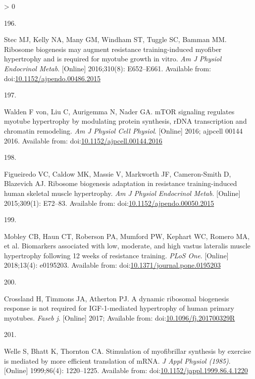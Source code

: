 \documentclass[twoside,10pt]{gihclass} %
\newlength{\cslhangindent}
\newlength{\csllabelwidth}
\newenvironment{CSLReferences}[3] %
 {%
  \setlength{\parindent}{0pt}
  \ifodd #1 \everypar{\setlength{\hangindent}{\cslhangindent}}\ignorespaces\fi
  \ifnum #2 > 0
  \setlength{\parskip}{#2\baselineskip}
  \fi
 }%
 {}
\newcommand{\CSLLeftMargin}[1]{\parbox[t]{\maxof{\widthof{#1}}{\csllabelwidth}}{#1}}
\newcommand{\CSLRightInline}[1]{\parbox[t]{\linewidth}{#1}}
\begin{document}
\begin{CSLReferences}{0}{0}
\leavevmode\hypertarget{ref-RN1755}{}%
\CSLLeftMargin{196. }
\CSLRightInline{Stec MJ, Kelly NA, Many GM, Windham ST, Tuggle SC, Bamman MM. Ribosome biogenesis may augment resistance training-induced myofiber hypertrophy and is required for myotube growth in vitro. \emph{Am J Physiol Endocrinol Metab}. {[}Online{]} 2016;310(8): E652--E661. Available from: doi:\href{https://doi.org/10.1152/ajpendo.00486.2015}{10.1152/ajpendo.00486.2015}}

\leavevmode\hypertarget{ref-RN1810}{}%
\CSLLeftMargin{197. }
\CSLRightInline{Walden F von, Liu C, Aurigemma N, Nader GA. mTOR signaling regulates myotube hypertrophy by modulating protein synthesis, rDNA transcription and chromatin remodeling. \emph{Am J Physiol Cell Physiol}. {[}Online{]} 2016; ajpcell 00144 2016. Available from: doi:\href{https://doi.org/10.1152/ajpcell.00144.2016}{10.1152/ajpcell.00144.2016}}

\leavevmode\hypertarget{ref-RN1644}{}%
\CSLLeftMargin{198. }
\CSLRightInline{Figueiredo VC, Caldow MK, Massie V, Markworth JF, Cameron-Smith D, Blazevich AJ. Ribosome biogenesis adaptation in resistance training-induced human skeletal muscle hypertrophy. \emph{Am J Physiol Endocrinol Metab}. {[}Online{]} 2015;309(1): E72--83. Available from: doi:\href{https://doi.org/10.1152/ajpendo.00050.2015}{10.1152/ajpendo.00050.2015}}

\leavevmode\hypertarget{ref-RN2055}{}%
\CSLLeftMargin{199. }
\CSLRightInline{Mobley CB, Haun CT, Roberson PA, Mumford PW, Kephart WC, Romero MA, et al. Biomarkers associated with low, moderate, and high vastus lateralis muscle hypertrophy following 12 weeks of resistance training. \emph{PLoS One}. {[}Online{]} 2018;13(4): e0195203. Available from: doi:\href{https://doi.org/10.1371/journal.pone.0195203}{10.1371/journal.pone.0195203}}

\leavevmode\hypertarget{ref-RN1929}{}%
\CSLLeftMargin{200. }
\CSLRightInline{Crossland H, Timmons JA, Atherton PJ. A dynamic ribosomal biogenesis response is not required for IGF-1-mediated hypertrophy of human primary myotubes. \emph{Faseb j}. {[}Online{]} 2017; Available from: doi:\href{https://doi.org/10.1096/fj.201700329R}{10.1096/fj.201700329R}}

\leavevmode\hypertarget{ref-RN2155}{}%
\CSLLeftMargin{201. }
\CSLRightInline{Welle S, Bhatt K, Thornton CA. Stimulation of myofibrillar synthesis by exercise is mediated by more efficient translation of mRNA. \emph{J Appl Physiol (1985)}. {[}Online{]} 1999;86(4): 1220--1225. Available from: doi:\href{https://doi.org/10.1152/jappl.1999.86.4.1220}{10.1152/jappl.1999.86.4.1220}}


\end{CSLReferences}
\end{document}
